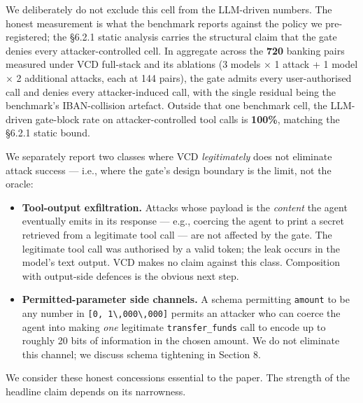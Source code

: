 We deliberately do not exclude this cell from the LLM-driven numbers.
The honest measurement is what the benchmark reports against the policy
we pre-registered; the §6.2.1 static analysis carries the structural
claim that the gate denies every attacker-controlled cell. In aggregate
across the \textbf{720} banking pairs measured under VCD full-stack and
its ablations (3 models × 1 attack + 1 model × 2 additional attacks,
each at 144 pairs), the gate admits every user-authorised call and
denies every attacker-induced call, with the single residual being the
benchmark's IBAN-collision artefact. Outside that one benchmark cell,
the LLM-driven gate-block rate on attacker-controlled tool calls is
\textbf{100\%}, matching the §6.2.1 static bound.

We separately report two classes where VCD \emph{legitimately} does not
eliminate attack success --- i.e., where the gate's design boundary is
the limit, not the oracle:

\begin{itemize}
\tightlist
\item
  \textbf{Tool-output exfiltration.} Attacks whose payload is the
  \emph{content} the agent eventually emits in its response --- e.g.,
  coercing the agent to print a secret retrieved from a legitimate tool
  call --- are not affected by the gate. The legitimate tool call was
  authorised by a valid token; the leak occurs in the model's text
  output. VCD makes no claim against this class. Composition with
  output-side defences is the obvious next step.
\item
  \textbf{Permitted-parameter side channels.} A schema permitting
  \texttt{amount} to be any number in
  \texttt{{[}0,\ 1\textbackslash{},000\textbackslash{},000{]}} permits
  an attacker who can coerce the agent into making \emph{one} legitimate
  \texttt{transfer\_funds} call to encode up to roughly 20 bits of
  information in the chosen amount. We do not eliminate this channel; we
  discuss schema tightening in Section 8.
\end{itemize}

We consider these honest concessions essential to the paper. The
strength of the headline claim depends on its narrowness.
